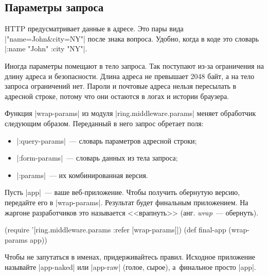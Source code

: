 \subsection{Параметры запроса}

\label{ring-params}


HTTP предусматривает данные в адресе. Это пары вида \spverb|"name=John&city=NY"|
после знака вопроса. Удобно, когда в коде это словарь
\spverb|{:name "John" :city "NY"}|.

Иногда параметры помещают в тело запроса. Так поступают из-за ограничения на
длину адреса и безопасности. Длина адреса не превышает 2048 байт, а на тело
запроса ограничений нет. Пароли и почтовые адреса нельзя пересылать в адресной
строке, потому что они остаются в логах и истории браузера.

Функция \spverb|wrap-params| из модуля \spverb|ring.middleware.params| меняет
обработчик следующим образом. Переданный в него запрос обретает поля:

\begin{itemize}

\item
  \spverb|:query-params|~--- словарь параметров адресной строки;

\item
  \spverb|:form-params|~--- словарь данных из тела запроса;

\item
  \spverb|:params|~--- их комбинированная версия.

\end{itemize}

Пусть \spverb|app|~--- ваше веб-приложение. Чтобы получить обернутую версию,
передайте его в \spverb|wrap-params|. Результат будет финальным приложением. На
жаргоне разработчиков это называется <<врапнуть>> (анг. \emph{wrap}~---
обернуть).


\begin{english}
  \begin{clojure}
(require '[ring.middleware.params :refer [wrap-params]])
(def final-app (wrap-params app))
  \end{clojure}
\end{english}

Чтобы не запутаться в именах, придерживайтесь правил. Исходное приложение
называйте \spverb|app-naked| или \spverb|app-raw| (голое, сырое), а~финальное
просто \spverb|app|.


